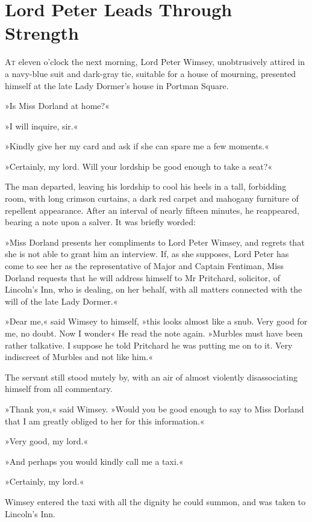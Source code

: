 \chapter{Lord Peter Leads Through Strength}

\lettrine[lines=4]{A}{t} eleven o'clock the next morning, Lord Peter Wimsey, unobtrusively attired in a navy-blue suit and dark-gray tie, suitable for a house of mourning, presented himself at the late Lady Dormer's house in Portman Square.

»Is Miss Dorland at home?«

»I will inquire, sir.«

»Kindly give her my card and ask if she can spare me a few moments.«

»Certainly, my lord. Will your lordship be good enough to take a seat?«

The man departed, leaving his lordship to cool his heels in a tall, forbidding room, with long crimson curtains, a dark red carpet and mahogany furniture of repellent appearance. After an interval of nearly fifteen minutes, he reappeared, bearing a note upon a salver. It was briefly worded:

»Miss Dorland presents her compliments to Lord Peter Wimsey, and regrets that she is not able to grant him an interview. If, as she supposes, Lord Peter has come to see her as the representative of Major and Captain Fentiman, Miss Dorland requests that he will address himself to Mr Pritchard, solicitor, of Lincoln's Inn, who is dealing, on her behalf, with all matters connected with the will of the late Lady Dormer.«

»Dear me,« said Wimsey to himself, »this looks almost like a snub. Very good for me, no doubt. Now I wonder\longdash« He read the note again. »Murbles must have been rather talkative. I suppose he told Pritchard he was putting me on to it. Very indiscreet of Murbles and not like him.«

The servant still stood mutely by, with an air of almost violently disassociating himself from all commentary.

»Thank you,« said Wimsey. »Would you be good enough to say to Miss Dorland that I am greatly obliged to her for this information.«

»Very good, my lord.«

»And perhaps you would kindly call me a taxi.«

»Certainly, my lord.«

Wimsey entered the taxi with all the dignity he could summon, and was taken to Lincoln's Inn.

